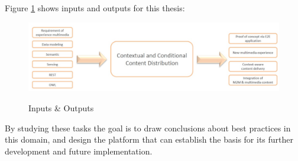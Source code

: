 \pagebreak

Figure \ref{fig:inout} shows inputs and outputs for this thesis:

\begin{figure}[htb]
  \centering
  \includegraphics[scale=0.4]{Inp_Out.jpg}\\
  \caption{Inputs \& Outputs}
  \label{fig:inout}
\end{figure}

By studying these tasks the goal is to draw conclusions about best practices in this domain, and design the platform that can establish the basis for its further development and future implementation.


